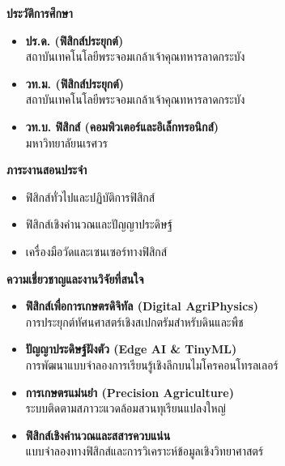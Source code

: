 \noindent
\begin{minipage}[t]{0.48\textwidth}
    {\fontsize{15}{18}\selectfont\bfseries\color{rbruNavy} ประวัติการศึกษา\par}
    \vspace{0.2cm}
    \begin{itemize}[leftmargin=1.2em, itemsep=2pt]
        \item \textbf{ปร.ด. (ฟิสิกส์ประยุกต์)}\\สถาบันเทคโนโลยีพระจอมเกล้าเจ้าคุณทหารลาดกระบัง
        \item \textbf{วท.ม. (ฟิสิกส์ประยุกต์)}\\สถาบันเทคโนโลยีพระจอมเกล้าเจ้าคุณทหารลาดกระบัง
        \item \textbf{วท.บ. ฟิสิกส์ (คอมพิวเตอร์และอิเล็กทรอนิกส์)}\\มหาวิทยาลัยนเรศวร
    \end{itemize}

    \vspace{0.3cm}
    {\fontsize{15}{18}\selectfont\bfseries\color{rbruNavy} ภาระงานสอนประจำ\par}
    \vspace{0.2cm}
    \begin{itemize}[leftmargin=1.2em, itemsep=2pt]
        \item ฟิสิกส์ทั่วไปและปฏิบัติการฟิสิกส์
        \item ฟิสิกส์เชิงคำนวณและปัญญาประดิษฐ์
        \item เครื่องมือวัดและเซนเซอร์ทางฟิสิกส์
    \end{itemize}
\end{minipage}%
\hfill
\begin{minipage}[t]{0.48\textwidth}
    {\fontsize{15}{18}\selectfont\bfseries\color{rbruNavy} ความเชี่ยวชาญและงานวิจัยที่สนใจ\par}
    \vspace{0.2cm}
    \begin{itemize}[leftmargin=1.2em, itemsep=2pt]
        \item \textbf{ฟิสิกส์เพื่อการเกษตรดิจิทัล (Digital AgriPhysics)}\\การประยุกต์ทัศนศาสตร์เชิงสเปกตรัมสำหรับดินและพืช
        \item \textbf{ปัญญาประดิษฐ์ฝังตัว (Edge AI \& TinyML)}\\การพัฒนาแบบจำลองการเรียนรู้เชิงลึกบนไมโครคอนโทรลเลอร์
        \item \textbf{การเกษตรแม่นยำ (Precision Agriculture)}\\ระบบติดตามสภาวะแวดล้อมสวนทุเรียนแปลงใหญ่
        \item \textbf{ฟิสิกส์เชิงคำนวณและสสารควบแน่น}\\แบบจำลองทางฟิสิกส์และการวิเคราะห์ข้อมูลเชิงวิทยาศาสตร์
    \end{itemize}
\end{minipage}
